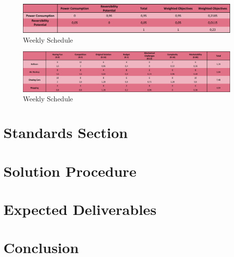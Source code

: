 \documentclass[a4paper,12pt]{article}
\begin{document}
\begin{figure}[H]
	\centering
	\includegraphics[width=\textwidth,height=\textheight,keepaspectratio]{images/proje_objective_tree_4} 
	\caption{\label{fig:schedule}Weekly Schedule}
	
\end{figure}

\begin{figure}[H]
	\centering
	\includegraphics[width=\textwidth,height=\textheight,keepaspectratio]{images/project_evaluation} 
	\caption{\label{fig:schedule}Weekly Schedule}
	
\end{figure}


\section{Standards Section}


\section{Solution Procedure}


\section{Expected Deliverables}





\section{Conclusion}
	
\begin{appendices}
	
	


	
\end{appendices}
\end{document}

